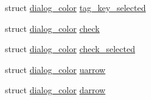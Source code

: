 \begin{DoxyCompactItemize}
\item 
struct \hyperlink{structdialog__color}{dialog\-\_\-color} \hyperlink{structdialog__info_afd71be0d9e5b567c771cc3602f7de398}{tag\-\_\-key\-\_\-selected}
\item 
struct \hyperlink{structdialog__color}{dialog\-\_\-color} \hyperlink{structdialog__info_a64028fca94d9b86520c81a70c8dad7c9}{check}
\item 
struct \hyperlink{structdialog__color}{dialog\-\_\-color} \hyperlink{structdialog__info_ab858b5507222b261d5375f05cb7be821}{check\-\_\-selected}
\item 
struct \hyperlink{structdialog__color}{dialog\-\_\-color} \hyperlink{structdialog__info_ab378bb8b1f9125eb865a564672025ee4}{uarrow}
\item 
struct \hyperlink{structdialog__color}{dialog\-\_\-color} \hyperlink{structdialog__info_a7e5d0d84cd0b3acd8805bfe8586d3f8e}{darrow}
\end{DoxyCompactItemize}


